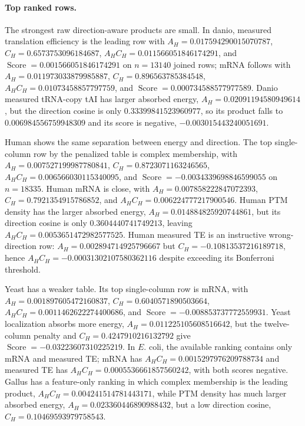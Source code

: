 \paragraph{Top ranked rows.}
The strongest raw direction-aware products are small.  In danio, measured translation efficiency is the leading row with $A_H=0.017594290015070787$, $C_H=0.6573753096184687$, $A_HC_H=0.011566051846174291$, and $\operatorname{Score}=0.001566051846174291$ on $n=13140$ joined rows; mRNA follows with $A_H=0.011973033879985887$, $C_H=0.896563785384548$, $A_HC_H=0.01073458857797759$, and $\operatorname{Score}=0.000734588577977589$.  Danio measured tRNA-copy tAI has larger absorbed energy, $A_H=0.02091194580949614$, but the direction cosine is only $0.33399841523960977$, so its product falls to $0.006984556759948309$ and its score is negative, $-0.003015443240051691$.

Human shows the same separation between energy and direction.  The top single-column row by the penalized table is complex membership, with $A_H=0.007527199987780841$, $C_H=0.8723071163246565$, $A_HC_H=0.006566030115340095$, and $\operatorname{Score}=-0.0034339698846599055$ on $n=18335$.  Human mRNA is close, with $A_H=0.007858222847072393$, $C_H=0.7921354915786852$, and $A_HC_H=0.006224777217900546$.  Human PTM density has the larger absorbed energy, $A_H=0.014884825920744861$, but its direction cosine is only $0.3604440741749213$, leaving $A_HC_H=0.0053651472982577525$.  Human measured TE is an instructive wrong-direction row: $A_H=0.002894714925796667$ but $C_H=-0.10813537216189718$, hence $A_HC_H=-0.00031302107580362116$ despite exceeding its Bonferroni threshold.

Yeast has a weaker table.  Its top single-column row is mRNA, with $A_H=0.001897605472160837$, $C_H=0.6040571890503664$, $A_HC_H=0.0011462622274400686$, and $\operatorname{Score}=-0.008853737772559931$.  Yeast localization absorbs more energy, $A_H=0.011225105608516642$, but the twelve-column penalty and $C_H=0.4247910216132792$ give $\operatorname{Score}=-0.03223607310225219$.  In $E.$ coli, the available ranking contains only mRNA and measured TE; mRNA has $A_HC_H=0.0015297976209788734$ and measured TE has $A_HC_H=0.0005536661857560242$, with both scores negative.  Gallus has a feature-only ranking in which complex membership is the leading product, $A_HC_H=0.004241514781443171$, while PTM density has much larger absorbed energy, $A_H=0.023360446890988432$, but a low direction cosine, $C_H=0.10469593979758543$.

